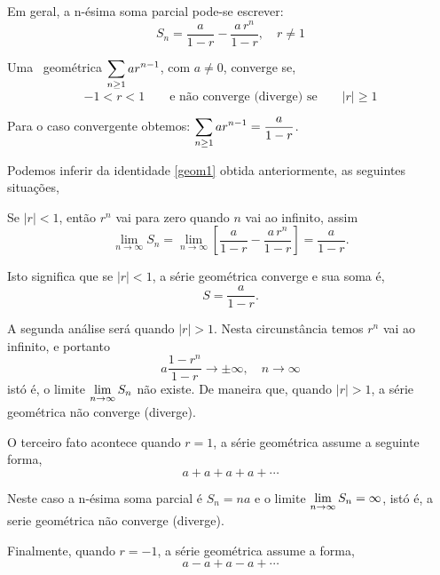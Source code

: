 Em geral, a n-\'{e}sima soma parcial pode-se escrever:
\begin{equation}\label{geom1}
  S_n=\frac{a}{1-r}-\frac{a\,r^n}{1-r},\quad r\neq 1
\end{equation}

\begin{theoc}{}{}
Uma \ser\ geom\'{e}trica $\displaystyle{\sum_{n\geq 1}ar^{n-1}}$, com $a\neq
0$, converge se,
\begin{equation*}
  -1<r<1\qquad\text{e n\~{a}o converge (diverge) se}\qquad |r|\geq 1
\end{equation*}

Para o caso convergente obtemos: $\displaystyle{\sum_{n\geq
1}ar^{n-1}=\frac{a}{1-r}}$.
\end{theoc}

\prova Podemos inferir da identidade \eqref{geom1} obtida
anteriormente, as seguintes situa\c{c}\~{o}es,

Se $|r|<1$, ent\~{a}o $r^n$ vai para zero quando $n$ vai ao infinito,
assim
\begin{equation*}
    \lim_{n\to\infty}S_n=\lim_{n\to\infty}\left[\frac{a}{1-r}-\frac{a\,r^n}{1-r}
    \right]=\frac{a}{1-r}.
\end{equation*}

Isto significa que se $|r|<1$, a s\'{e}rie geom\'{e}trica converge e sua
soma \'{e},
\begin{equation*}
    S=\frac{a}{1-r}.
\end{equation*}

A segunda an\'{a}lise ser\'{a} quando $|r|>1$. Nesta circunst\^{a}ncia temos
$r^n$ vai ao infinito, e portanto
\begin{equation*}
    a\frac{1-r^n}{1-r}\to\pm \infty,\quad n\to\infty
\end{equation*}
ist\'{o} \'{e}, o limite $\displaystyle{\lim_{n\to\infty}S_n}$ n\~{a}o existe. De
maneira que, quando $|r|>1$, a s\'{e}rie geom\'{e}trica n\~{a}o converge
(diverge).

O terceiro fato acontece quando $r=1$, a s\'{e}rie geom\'{e}trica assume a
seguinte forma,
\begin{equation*}
    a+a+a+a+\cdots
\end{equation*}

Neste caso a n-ésima soma parcial \'{e} $S_n=na$ e o limite
$\displaystyle{\lim_{n\to\infty}S_n=\infty}$, ist\'{o} \'{e}, a serie geom\'{e}trica
n\~{a}o converge (diverge).

Finalmente, quando $r=-1$, a s\'{e}rie geom\'{e}trica assume a forma,
\begin{equation*}
    a-a+a-a+\cdots
\end{equation*}

